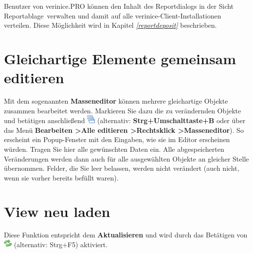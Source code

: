 \documentclass[a4paper,10pt]{book}
\begin{document}
Benutzer von verinice.PRO können den Inhalt des Reportdialogs in der
Sicht \glqq Reportablage\grqq\ verwalten und damit auf alle
verinice-Client-Installationen verteilen. Diese Möglichkeit wird in
Kapitel {\em \ref{reportdeposit} } beschrieben.


\section{Gleichartige Elemente gemeinsam editieren}
Mit dem sogenannten \textbf{Masseneditor} können mehrere gleichartige Objekte zusammen bearbeitet werden. Markieren Sie dazu die zu
verändernden Objekte und betätigen anschließend \includegraphics[height=2ex]{Icon/Masseneditor.png} (alternativ: \textbf{Strg+Umschalttaste+B} oder über das
Menü \textbf{Bearbeiten \textgreater Alle editieren \textgreater Rechtsklick \textgreater Masseneditor}). So erscheint ein Popup-Fenster mit den Eingaben,
wie sie im Editor erscheinen würden. Tragen Sie hier alle gewünschten Daten ein. Alle abgespeicherten Veränderungen
werden dann auch für alle ausgewählten Objekte an gleicher Stelle übernommen. Felder, die Sie leer belassen, werden
nicht verändert (auch nicht, wenn sie vorher bereits befüllt waren).

\section{View neu laden}
Diese Funktion entspricht dem \textbf{Aktualisieren} und wird durch das Betätigen von \includegraphics[height=2ex]{Icon/Aktualisieren.png} (alternativ: Strg+F5) aktiviert.
\end{document}
